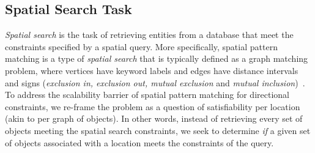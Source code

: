 \subsection{Spatial Search Task}
\par{
    \textit{Spatial search} is the task of retrieving entities from a database that meet the constraints specified by a spatial query.
    More specifically, spatial pattern matching is a type of \textit{spatial search} that is typically defined as a graph matching problem, where vertices have keyword labels and edges have distance intervals and signs (\textit{exclusion in, exclusion out, mutual exclusion} and \textit{mutual inclusion})~\cite{Fang2019}.
    To address the scalability barrier of spatial pattern matching for directional constraints, we re-frame the problem as a question of satisfiability per location (akin to per graph of objects).
    In other words, instead of retrieving every set of objects meeting the spatial search constraints, we seek to determine \emph{if} a given set of objects associated with a location meets the constraints of the query.
}

















































    
                    
        
                    
                        
            
    
        
            
